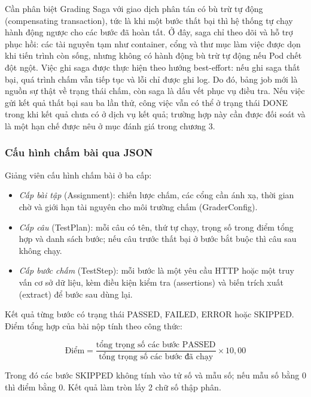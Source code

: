 \documentclass[../BTL.tex]{subfiles}
\begin{document}
Cần phân biệt Grading Saga với giao dịch phân tán có bù trừ tự động (compensating transaction), tức là khi một bước thất bại thì hệ thống tự chạy hành động ngược cho các bước đã hoàn tất. Ở đây, saga chỉ theo dõi và hỗ trợ phục hồi: các tài nguyên tạm như container, cổng và thư mục làm việc được dọn khi tiến trình còn sống, nhưng không có hành động bù trừ tự động nếu Pod chết đột ngột. Việc ghi saga được thực hiện theo hướng best-effort: nếu ghi saga thất bại, quá trình chấm vẫn tiếp tục và lỗi chỉ được ghi log. Do đó, bảng job mới là nguồn sự thật về trạng thái chấm, còn saga là dấu vết phục vụ điều tra. Nếu việc gửi kết quả thất bại sau ba lần thử, công việc vẫn có thể ở trạng thái DONE trong khi kết quả chưa có ở dịch vụ kết quả; trường hợp này cần được đối soát và là một hạn chế được nêu ở mục đánh giá trong chương 3.

\subsubsection{Cấu hình chấm bài qua JSON}

Giảng viên cấu hình chấm bài ở ba cấp:

\begin{itemize}
\item \emph{Cấp bài tập} (\textnormal{Assignment}): chiến lược chấm, các cổng cần ánh xạ, thời gian chờ và giới hạn tài nguyên cho môi trường chấm (\textnormal{GraderConfig}).
\item \emph{Cấp câu} (\textnormal{TestPlan}): mỗi câu có tên, thứ tự chạy, trọng số trong điểm tổng hợp và danh sách bước; nếu câu trước thất bại ở bước bắt buộc thì câu sau không chạy.
\item \emph{Cấp bước chấm} (\textnormal{TestStep}): mỗi bước là một yêu cầu HTTP hoặc một truy vấn cơ sở dữ liệu, kèm điều kiện kiểm tra (\textnormal{assertions}) và biến trích xuất (\textnormal{extract}) để bước sau dùng lại.
\end{itemize}

Kết quả từng bước có trạng thái \textnormal{PASSED}, \textnormal{FAILED}, \textnormal{ERROR} hoặc \textnormal{SKIPPED}. Điểm tổng hợp của bài nộp tính theo công thức:

\begin{equation}\label{eq:scoring}
\text{Điểm} = \frac{\text{tổng trọng số các bước PASSED}}{\text{tổng trọng số các bước đã chạy}} \times 10{,}00
\end{equation}

Trong đó các bước \textnormal{SKIPPED} không tính vào tử số và mẫu số; nếu mẫu số bằng 0 thì điểm bằng 0. Kết quả làm tròn lấy 2 chữ số thập phân.
\end{document}
